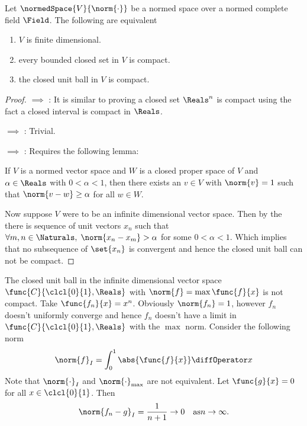 \begin{theorem}\label{th:CompactnessOfFiniteDimensional}
    Let \(\normedSpace{V}{\norm{\cdot}}\) be a normed space over a normed complete field \(\Field\). The following are equivalent
    \begin{enumerate}
        \item \(V\) is finite dimensional. \label{it:COFD_1}
        \item every bounded closed set in \(V\) is compact. \label{it:COFD_2}
        \item the closed unit ball in \(V\) is compact. \label{it:COFD_3}
    \end{enumerate}
\end{theorem}
\begin{proof}
     \(\implies\) : It is similar to proving a closed set \(\Reals^n\) is compact using the fact a closed interval is compact in \(\Reals\).

     \(\implies\) : Trivial.

     \(\implies\) : Requires the following lemma:
    \begin{lemma} \label{lm:RieszsLemma}
        If \(V\) is a normed vector space and \(W\) is a closed proper space of \(V\) and \(\alpha \in \Reals\) with \(0 < \alpha < 1\), then there exists an \(v \in V\) with \(\norm{v} = 1\) such that \(\norm{v- w} \geq \alpha \) for all \(w \in W\).
    \end{lemma}
    Now suppose \(V\) were to be an infinite dimensional vector space. Then by the  there is sequence of unit vectors \({x_n}\) such that \(\forall m,n \in \Naturals, \; \norm{x_n - x_m} > \alpha\) for some \(0 <\alpha < 1\). Which implies that no subsequence of \(\set{x_n}\) is convergent and hence the closed unit ball can not be compact.
\end{proof}

\begin{example}
    The closed unit ball in the infinite dimensional vector space \(\func{C}{\clcl{0}{1},\Reals}\) with \(\norm{f} = \max \func{f}{x}\) is not compact.  Take \(\func{f_n}{x} = x^n\). Obviously \(\norm{f_n} = 1\), however \(f_n\) doesn't uniformly converge and hence \(f_n\) doesn't have a limit in \(\func{C}{\clcl{0}{1},\Reals}\) with the \(\max\) norm. Consider the following norm
    \begin{equation*}
        \norm{f}_I = \int_0^1 \abs{\func{f}{x}} \diffOperator x
    \end{equation*}
    Note that \(\norm{\cdot}_I\) and \(\norm{\cdot}_{\max} \) are not equivalent. Let \(\func{g}{x} = 0\) for all \(x \in \clcl{0}{1}\). Then
    \begin{equation*}
        \norm{f_n - g}_I = \dfrac{1}{n+1} \to 0 \quad \text{as} n \to \infty.
    \end{equation*}
\end{example}

